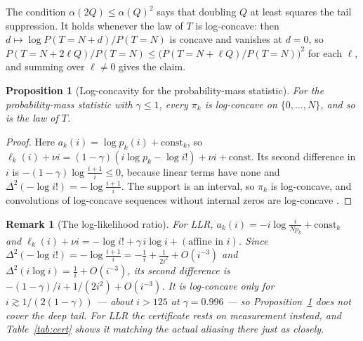 \documentclass[11pt]{article}
\newtheorem{proposition}{Proposition}
\newtheorem{remark}{Remark}
\begin{document}
The condition $\alpha(2Q)\le\alpha(Q)^2$ says that doubling $Q$ at least squares the tail
suppression. It holds whenever the law of $T$ is log-concave: then $d\mapsto\log P(T=N+d)/P(T=N)$ is
concave and vanishes at $d=0$, so $P(T=N+2\ell Q)/P(T=N)\le\big(P(T=N+\ell Q)/P(T=N)\big)^2$ for each
$\ell$, and summing over $\ell\ne0$ gives the claim.

\begin{proposition}[Log-concavity for the probability-mass statistic]
\label{prop:logconcave}
For the probability-mass statistic with $\gamma\le1$, every $\pi_k$ is log-concave on
$\{0,\dots,N\}$, and so is the law of $T$.
\end{proposition}
\begin{proof}
Here $a_k(i)=\log p_k(i)+\mathrm{const}_k$, so $\ell_k(i)+\nu i=(1-\gamma)(i\log p_k-\log i!)+\nu i+\mathrm{const}$.
Its second difference in $i$ is $-(1-\gamma)\log\frac{i+1}{i}\le0$, because linear terms have none
and $\Delta^2(-\log i!)=-\log\frac{i+1}{i}$. The support is an interval, so $\pi_k$ is log-concave,
and convolutions of log-concave sequences without internal zeros are log-concave
\citep{hoggar1974}.
\end{proof}

\begin{remark}[The log-likelihood ratio]
For LLR, $a_k(i)=-i\log\frac{i}{Np_k}+\mathrm{const}_k$ and
$\ell_k(i)+\nu i=-\log i!+\gamma\,i\log i+(\text{affine in }i)$. Since
$\Delta^2(-\log i!)=-\log\frac{i+1}{i}=-\frac1i+\frac1{2i^2}+O(i^{-3})$ and
$\Delta^2(i\log i)=\frac1i+O(i^{-3})$, its second difference is
$-(1-\gamma)/i+1/(2i^2)+O(i^{-3})$. It is log-concave only for
$i\gtrsim1/(2(1-\gamma))$ --- about $i>125$ at $\gamma=0.996$ --- so
Proposition~\ref{prop:logconcave} does not cover the deep tail. For LLR the certificate rests on
measurement instead, and Table~\ref{tab:cert} shows it matching the actual aliasing there just as
closely.
\end{remark}
\end{document}
